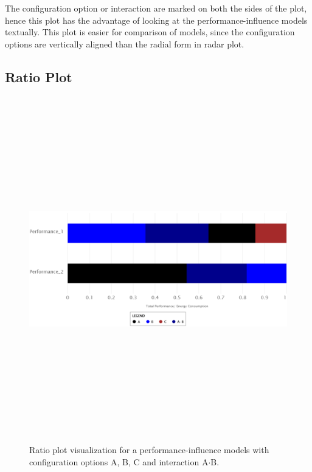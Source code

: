 The configuration option or interaction are marked on both the sides of the plot, hence this plot has the advantage of looking at the performance-influence models textually. This plot is easier for comparison of models, since the configuration options are vertically aligned than the radial form in radar plot.

\subsection{Ratio Plot}

\begin{figure}[ht]
    \centering
    \label{ratioPlot}
   \includegraphics[width=15cm,height=15cm,keepaspectratio,]{pics/ratio_plot.pdf}
    \caption[Ratio Plot]{Ratio plot visualization for a performance-influence models with configuration options A, B, C and interaction A$\cdot$B.}
\end{figure}


